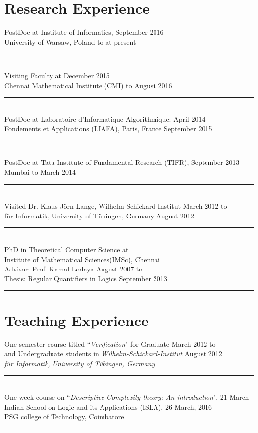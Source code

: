 \documentclass[margin]{res}
\begin{document}
\begin{resume}
\section{Research Experience} PostDoc at Institute of Informatics, \hfill September 2016 \\
					University of Warsaw, Poland \hfill to at present \\
					\noindent\rule{13cm}{0.4pt} \\
					Visiting Faculty at 	\hfill December 2015 \\
					Chennai Mathematical Institute (CMI)  \hfill to August 2016 \\
					\noindent\rule{13cm}{0.4pt} \\
					PostDoc at Laboratoire d{'}Informatique Algorithmique: \hfill April 2014\\
					Fondements et Applications (LIAFA),	Paris, France \hfill September 2015 \\
					\noindent\rule{13cm}{0.4pt} \\
					PostDoc at Tata Institute of Fundamental Research (TIFR),  \hfill September 2013 \\
					Mumbai	\hfill	to March 2014
					\noindent\rule{13cm}{0.4pt} \\					
					Visited Dr. Klaus-J\"orn Lange, Wilhelm-Schickard-Institut \hfill March 2012 to\\
					f\"ur Informatik, University of T\"ubingen, Germany \hfill August 2012 
					\noindent\rule{13cm}{0.4pt} \\
					PhD in Theoretical Computer Science at \\
					Institute of Mathematical Sciences(IMSc), Chennai \\
					Advisor: Prof. Kamal Lodaya \hfill August 2007 to \\
					Thesis: Regular Quantifiers in Logics \hfill September 2013 \\
					\noindent\rule{13cm}{0.4pt} 
									
\section{Teaching Experience}
					One semester course titled ``\emph{Verification}" for Graduate \hfill March 2012 to  \\
					and Undergraduate students in \emph{Wilhelm-Schickard-Institut} \hfill August 2012\\ 
					\emph{f\"ur Informatik, University of T\"ubingen, Germany} \\
					\noindent\rule{13cm}{0.4pt} \\
					One week course on ``\emph{Descriptive Complexity theory: An introduction}", \hfill 21 March \\
					 Indian School on Logic and its Applications (ISLA),   \hfill 26 March, 2016 \\
					 PSG college of Technology, Coimbatore \\
					\noindent\rule{13cm}{0.4pt} 


\end{resume}
\end{document}
